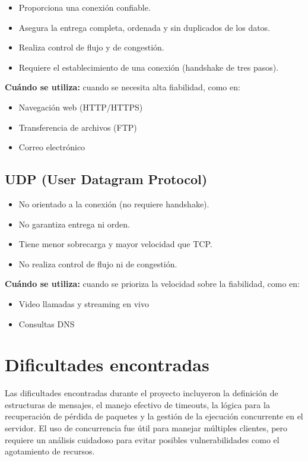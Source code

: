 \documentclass[a4paper,10pt]{article}
\begin{document}
\begin{itemize}
    \item Proporciona una conexión confiable.
    \item Asegura la entrega completa, ordenada y sin duplicados de los datos.
    \item Realiza control de flujo y de congestión.
    \item Requiere el establecimiento de una conexión (handshake de tres pasos).
\end{itemize}

\textbf{Cuándo se utiliza:} cuando se necesita alta fiabilidad, como en:
\begin{itemize}
    \item Navegación web (HTTP/HTTPS)
    \item Transferencia de archivos (FTP)
    \item Correo electrónico
\end{itemize}

\subsection*{UDP (User Datagram Protocol)}

\begin{itemize}
    \item No orientado a la conexión (no requiere handshake).
    \item No garantiza entrega ni orden.
    \item Tiene menor sobrecarga y mayor velocidad que TCP.
    \item No realiza control de flujo ni de congestión.
\end{itemize}

\textbf{Cuándo se utiliza:} cuando se prioriza la velocidad sobre la fiabilidad, como en:
\begin{itemize}
    \item Video llamadas y streaming en vivo
    \item Consultas DNS
\end{itemize}


\section{Dificultades encontradas}
Las dificultades encontradas durante el proyecto incluyeron la definición de estructuras de mensajes, el manejo efectivo de timeouts, la lógica para la recuperación de pérdida de paquetes y la gestión de la ejecución concurrente en el servidor. El uso de concurrencia fue útil para manejar múltiples clientes, pero requiere un análisis cuidadoso para evitar posibles vulnerabilidades como el agotamiento de recursos.
\end{document}
